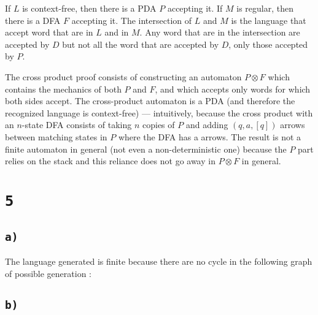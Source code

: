 \documentclass[a4paper,11pt]{report}
\begin{document}
If $L$ is context-free, then there is a PDA $P$ accepting it. If $M$ is regular,
then there is a DFA $F$ accepting it. The intersection of $L$ and $M$ is the
language that accept word that are in $L$ and in $M$. Any word that are in the
intersection are accepted by $D$ but not all the word that are accepted by $D$,
only those accepted by $P$.

The cross product proof consists of constructing an automaton $P \otimes F$
which contains the mechanics of both $P$ and $F$, and which accepts only words for
which both sides accept. The cross-product automaton is a PDA (and therefore the
recognized language is context-free) — intuitively, because the cross product
with an $n$-state DFA consists of taking $n$ copies of $P$ and adding
$(q,a,[q])$ arrows between matching states in $P$ where the DFA has a arrows.
The result is not a finite automaton in general (not even a non-deterministic
one) because the $P$ part relies on the stack and this reliance does not go away
in $P \otimes F$ in general.

\section*{\texttt{5}}

\subsection*{\texttt{a)}}

The language generated is finite because there are no cycle in the following
graph of possible generation :

\begin{center}
\end{center}

\subsection*{\texttt{b)}}
\end{document}
